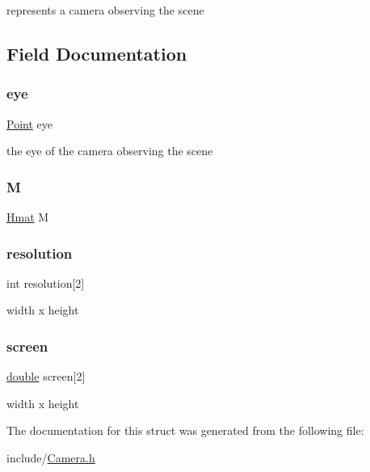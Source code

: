 represents a camera observing the scene 

\subsection{Field Documentation}
\mbox{\label{struct_camera_a3f0f7501902ff66889e21c369d1159d0}} 
\subsubsection{\texorpdfstring{eye}{eye}}
{\footnotesize\ttfamily \hyperlink{struct_point}{Point} eye}

the eye of the camera observing the scene \mbox{\label{struct_camera_a94d9bf45fca18b32481a1bbd1ea58bdf}} 
\subsubsection{\texorpdfstring{M}{M}}
{\footnotesize\ttfamily \hyperlink{_hmat_8h_a7263a9d077d77f58425e01446b766c9f}{Hmat} M}

\mbox{\label{struct_camera_a5496c6b1391a3368a05f6b7a44cc2aa0}} 
\subsubsection{\texorpdfstring{resolution}{resolution}}
{\footnotesize\ttfamily int resolution\mbox{[}2\mbox{]}}

width x height \mbox{\label{struct_camera_aad384fcdec994533787d54acd096c5cb}} 
\subsubsection{\texorpdfstring{screen}{screen}}
{\footnotesize\ttfamily \hyperlink{g3x__transfo_8h_a89b2b23e407882a535d835574a7912e1}{double} screen\mbox{[}2\mbox{]}}

width x height 

The documentation for this struct was generated from the following file\+:\begin{DoxyCompactItemize}
\item 
include/\hyperlink{_camera_8h}{Camera.\+h}\end{DoxyCompactItemize}
